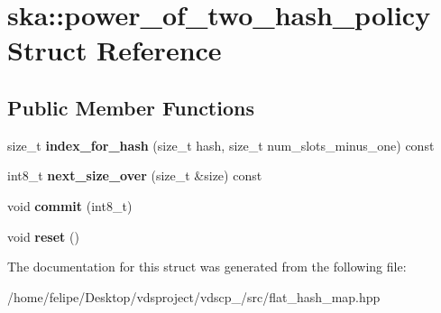 \section{ska\+:\+:power\+\_\+of\+\_\+two\+\_\+hash\+\_\+policy Struct Reference}
\label{structska_1_1power__of__two__hash__policy}
\subsection*{Public Member Functions}
\begin{DoxyCompactItemize}
\item 
size\+\_\+t {\bfseries index\+\_\+for\+\_\+hash} (size\+\_\+t hash, size\+\_\+t num\+\_\+slots\+\_\+minus\+\_\+one) const \label{structska_1_1power__of__two__hash__policy_a00ff8699ccb31f173a4e61e1c7b70754}

\item 
int8\+\_\+t {\bfseries next\+\_\+size\+\_\+over} (size\+\_\+t \&size) const \label{structska_1_1power__of__two__hash__policy_a549ddfd949be3f587c49f7554778f3f9}

\item 
void {\bfseries commit} (int8\+\_\+t)\label{structska_1_1power__of__two__hash__policy_a53b77defec0ddede94abdf6c97f463d6}

\item 
void {\bfseries reset} ()\label{structska_1_1power__of__two__hash__policy_aae69bae44c4a35e0f45f18ed09b12c22}

\end{DoxyCompactItemize}


The documentation for this struct was generated from the following file\+:\begin{DoxyCompactItemize}
\item 
/home/felipe/\+Desktop/vdsproject/vdscp\+\_/src/flat\+\_\+hash\+\_\+map.\+hpp\end{DoxyCompactItemize}
